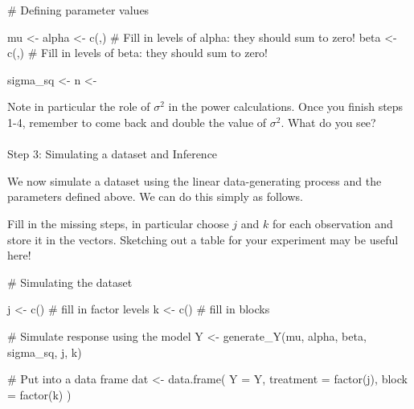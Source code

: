 \documentclass[
  letterpaper,
  DIV=11,
  numbers=noendperiod]{scrartcl}
\makeatletter
\let\oldparagraph\paragraph
\renewcommand{\paragraph}{
    \@ifstar
      \xxxParagraphStar
      \xxxParagraphNoStar
  }
\newcommand{\xxxParagraphStar}[1]{\oldparagraph*{#1}\mbox{}}
\newcommand{\xxxParagraphNoStar}[1]{\oldparagraph{#1}\mbox{}}
\newenvironment{Shaded}{\begin{snugshade}}{\end{snugshade}}
\newcommand{\AttributeTok}[1]{\textcolor[rgb]{0.40,0.45,0.13}{#1}}
\newcommand{\CommentTok}[1]{\textcolor[rgb]{0.37,0.37,0.37}{#1}}
\newcommand{\FunctionTok}[1]{\textcolor[rgb]{0.28,0.35,0.67}{#1}}
\newcommand{\NormalTok}[1]{\textcolor[rgb]{0.00,0.23,0.31}{#1}}
\newcommand{\OtherTok}[1]{\textcolor[rgb]{0.00,0.23,0.31}{#1}}
\makeatother
\begin{document}
\begin{Shaded}
\begin{Highlighting}[]
\CommentTok{\# Defining parameter values}

\NormalTok{mu }\OtherTok{\textless{}{-}}
\NormalTok{alpha }\OtherTok{\textless{}{-}} \FunctionTok{c}\NormalTok{(,) }\CommentTok{\# Fill in levels of alpha: they should sum to zero!}
\NormalTok{beta }\OtherTok{\textless{}{-}} \FunctionTok{c}\NormalTok{(,)  }\CommentTok{\# Fill in levels of beta: they should sum to zero!}

\NormalTok{sigma\_sq }\OtherTok{\textless{}{-}}
\NormalTok{n }\OtherTok{\textless{}{-}} 
\end{Highlighting}
\end{Shaded}

Note in particular the role of \(\sigma^2\) in the power calculations.
Once you finish steps 1-4, remember to come back and double the value of
\(\sigma^2\). What do you see?

\paragraph{Step 3: Simulating a dataset and
Inference}\label{step-3-simulating-a-dataset-and-inference}

We now simulate a dataset using the linear data-generating process and
the parameters defined above. We can do this simply as follows.

Fill in the missing steps, in particular choose \(j\) and \(k\) for each
observation and store it in the vectors. Sketching out a table for your
experiment may be useful here!

\begin{Shaded}
\begin{Highlighting}[]
\CommentTok{\# Simulating the dataset}

\NormalTok{j }\OtherTok{\textless{}{-}} \FunctionTok{c}\NormalTok{()  }\CommentTok{\# fill in factor levels}
\NormalTok{k }\OtherTok{\textless{}{-}} \FunctionTok{c}\NormalTok{()  }\CommentTok{\# fill in blocks}

\CommentTok{\# Simulate response using the model}
\NormalTok{Y }\OtherTok{\textless{}{-}} \FunctionTok{generate\_Y}\NormalTok{(mu, alpha, beta, sigma\_sq, j, k)}

\CommentTok{\# Put into a data frame}
\NormalTok{dat }\OtherTok{\textless{}{-}} \FunctionTok{data.frame}\NormalTok{(}
  \AttributeTok{Y =}\NormalTok{ Y,}
  \AttributeTok{treatment =} \FunctionTok{factor}\NormalTok{(j),}
  \AttributeTok{block =} \FunctionTok{factor}\NormalTok{(k)}
\NormalTok{)}
\end{Highlighting}
\end{Shaded}
\end{document}
